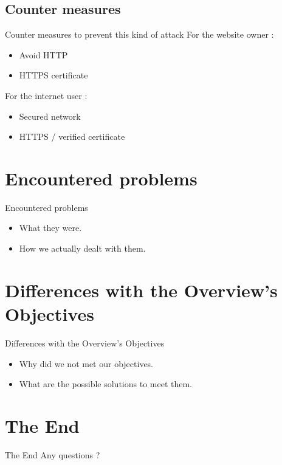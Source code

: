 \documentclass{beamer}
\begin{document}
\subsection{Counter measures}
\begin{frame}{Counter measures to prevent this kind of attack}
For the website owner : \\
	\begin{itemize}
		\pause \item Avoid HTTP\\
		\pause \item HTTPS certificate\\
	\end{itemize}
\pause For the internet user : \\
	\begin{itemize}
		\pause \item Secured network\\
		\pause \item HTTPS / verified certificate\\
	\end{itemize}
\end{frame}

\section{Encountered problems}
\begin{frame}{Encountered problems}
	\begin{itemize}
		\item What they were.\\
		\item How we actually dealt with them.\\
	\end{itemize}	
\end{frame}

\section{Differences with the Overview's Objectives}
\begin{frame}{Differences with the Overview's Objectives}
	\begin{itemize}
		\item Why did we not met our objectives.\\
		\item What are the possible solutions to meet them.\\
	\end{itemize}
\end{frame}

\section{The End}
\begin{frame}{The End}
	Any questions ?
\end{frame}
\end{document}
